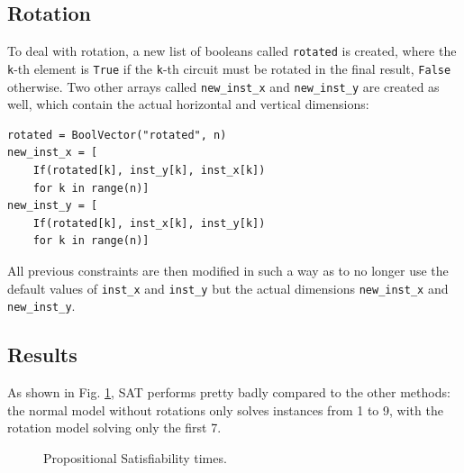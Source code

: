 \documentclass[a4paper, 12pt]{article}
\begin{document}
\subsection{Rotation}
To deal with rotation, a new list of booleans called \verb|rotated| is created, where the \verb|k|-th element is \verb|True| if the \verb|k|-th circuit must be rotated in the final result, \verb|False| otherwise. Two other arrays called \verb|new_inst_x| and \verb|new_inst_y| are created as well, which contain the actual horizontal and vertical dimensions:
\begin{verbatim}
rotated = BoolVector("rotated", n)
new_inst_x = [
    If(rotated[k], inst_y[k], inst_x[k])
    for k in range(n)]
new_inst_y = [
    If(rotated[k], inst_x[k], inst_y[k])
    for k in range(n)]
 \end{verbatim}
 
All previous constraints are then modified in such a way as to no longer use the default values of \verb|inst_x| and \verb|inst_y| but the actual dimensions \verb|new_inst_x| and \verb|new_inst_y|.

\subsection{Results}
As shown in Fig. \ref{fig:sat}, SAT performs pretty badly compared to the other methods: the normal model without rotations only solves instances from 1 to 9, with the rotation model solving only the first 7.

\begin{figure}
    \centering
        \caption{Propositional Satisfiability times.}
    \label{fig:sat}  
\end{figure}
\end{document}
